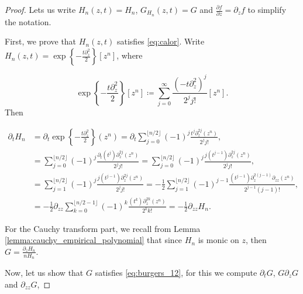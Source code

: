 \begin{proof}

    Lets us write $H_n(z,t)= H_n$, $G_{H_n}(z,t) = G$ and $\frac{\partial f}{\partial z} = \partial_z f$ to simplify the notation.

    First, we prove that $H_n(z,t)$ satisfies \eqref{eq:calor}. Write $H_n(z,t) = \exp\left\{-\frac{t \partial_z^2}{2}\right\}[z^n]$, where

    \begin{equation*}
        \exp\left\{-\frac{t \partial_z^2}{2}\right\} [z^n] \coloneqq \sum_{j=0}^\infty \frac{\left( -t \partial_z^2 \right)^j }{2^j j!} [z^n].
    \end{equation*}
    Then 

    \begin{align*}
        \partial_t H_n &= \partial_t \exp\left\{-\frac{t \partial_z^2}{2}\right\}(z^n) 
        = \partial_t \sum_{j=0}^{\lfloor n/2 \rfloor} (-1)^j \frac{t^j \partial_z^{2j}(z^n) }{2^j j!},\\ 
        &= \sum_{j=0}^{\lfloor n/2 \rfloor} (-1)^j \frac{\partial_t (t^j) \partial_z^{2j}(z^n) }{2^j j!} = \sum_{j=0}^{\lfloor n/2 \rfloor} (-1)^j \frac{j(t^{j-1}) \partial_z^{2j}(z^n) }{2^j j!},\\ 
        &= \sum_{j=1}^{\lfloor n/2 \rfloor} (-1)^j \frac{j(t^{j-1}) \partial_z^{2j}(z^n) }{2^j j!}= -\frac12\sum_{j=1}^{\lfloor n/2 \rfloor} (-1)^{j-1} \frac{(t^{j-1}) \partial_z^{2(j-1)}\partial_{zz}(z^n) }{2^{j-1} (j-1)!}, \\ 
        &= -\frac12\partial_{zz} \sum_{k=0}^{\lfloor n/2 - 1\rfloor} (-1)^{k} \frac{(t^{k}) \partial_z^{2k}(z^n) }{2^{k} k!} = - \frac12 \partial_{zz} H_n.
    \end{align*}

    
    
    For the Cauchy transform part, we recall from Lemma \ref{lemma:cauchy_empirical_polynomial} that since $H_n$ is monic on $z$, then  $G= \frac{\partial_z H_n}{nH_n}$.

    Now, let us show that $G$ satisfies \eqref{eq:burgers_12}, for this we compute $\partial_t G$, $G\partial_z G$ and $\partial_{zz}G$,


\end{proof}
